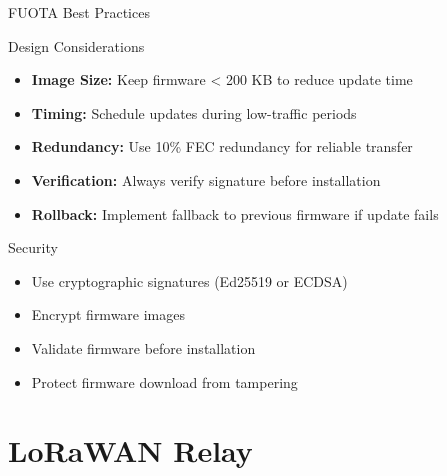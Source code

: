 \documentclass{beamer}
\begin{document}
\begin{frame}{FUOTA Best Practices}
\begin{block}{Design Considerations}
\begin{itemize}
    \item \textbf{Image Size:} Keep firmware < 200 KB to reduce update time
    \item \textbf{Timing:} Schedule updates during low-traffic periods
    \item \textbf{Redundancy:} Use 10\% FEC redundancy for reliable transfer
    \item \textbf{Verification:} Always verify signature before installation
    \item \textbf{Rollback:} Implement fallback to previous firmware if update fails
\end{itemize}
\end{block}

\vspace{0.3cm}

\begin{alertblock}{Security}
\begin{itemize}
    \item Use cryptographic signatures (Ed25519 or ECDSA)
    \item Encrypt firmware images
    \item Validate firmware before installation
    \item Protect firmware download from tampering
\end{itemize}
\end{alertblock}
\end{frame}

\section{LoRaWAN Relay}
\end{document}
